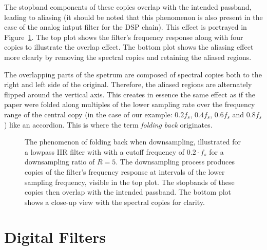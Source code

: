 The stopband  components of these  copies overlap with the  intended passband,
leading to aliasing  (it should be noted that this  phenomenon is also present
in the  case of the  analog intput filter for  the DSP chain). This  effect is
portrayed  in  Figure~\ref{fig:aliasing:iirCopies}. The  top  plot  shows  the
filter's frequency response  along with four copies to  illustrate the overlap
effect. The bottom plot shows the aliasing effect more clearly by removing the
spectral copies and retaining the aliased regions.

The overlapping parts  of the spetrum are composed of  spectral copies both to
the right  and left side of  the original. Therefore, the aliased  regions are
alternately flipped around the vertical axis. This creates in essence the same
effect  as if  the paper  were folded  along multiples  of the  lower sampling
rate  over the  frequency  range of  the  central  copy (in  the  case of  our
example: $0.2f_s$, $0.4f_s$, $0.6f_s$ and $0.8f_s$) like an accordion. This is
where the term \emph{folding back} originates.

\begin{figure}
    \centering
    
    \caption[Folding Back of Stopband Components Into Passband]{%
        The phenomenon  of folding back  when downsampling, illustrated  for a
        lowpass IIR filter with with a  cutoff frequency of $0.2\cdot f_s$ for
        a  downsampling ratio  of  $R=5$.  The  downsampling process  produces
        copies of  the filter's frequency  response at intervals of  the lower
        sampling frequency, visible  in the top plot.  The  stopbands of these
        copies then overlap with the intended passband.  The bottom plot shows
        a close-up view with the spectral copies for clarity.%
    }
    \label{fig:aliasing:iirCopies}
\end{figure}

%
%
\section{Digital Filters}%
\label{sec:digital_filters}

